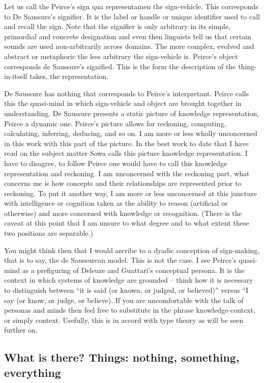 \documentclass[dah,phd,a4paper]{xe_uccthesis}
\begin{document}
	Let us call the Peirce's sign qua representamen the sign-vehicle. This corresponds to De Saussure's signifier. It is the label or handle or unique identifier used to call and recall the sign. Note that the signifier is only arbitrary in its simple, primordial and concrete designation and even then linguists tell us that certain sounds are used non-arbitrarily across domains. The more complex, evolved and abstract or metaphoric the less arbitrary the sign-vehicle is. Peirce's object corresponds de Saussure's signified. This is the form the description of the thing-in-itself takes, the representation.
	
	De Saussure has nothing that corresponds to Peirce's interpretant. Peirce calls this the quasi-mind in which sign-vehicle and object are brought together in understanding. De Saussure presents a static picture of knowledge representation, Peirce a dynamic one. Peirce's picture allows for reckoning, computing, calculating, inferring, deducing, and so on. I am more or less wholly unconcerned in this work with this part of the picture. In the best work to date that I have read on the subject matter Sowa calls this picture knowledge representation. I have to disagree, to follow Peirce one would have to call this knowledge representation and reckoning. I am unconcerned with the reckoning part, what concerns me is how concepts and their relationships are represented prior to reckoning. To put it another way, I am more or less unconcerned at this juncture with intelligence or cognition taken as the ability to reason (artificial or otherwise) and more concerned with knowledge or recognition. (There is the caveat at this point that I am unsure to what degree and to what extent these two positions are separable.)
	
	You might think then that I would ascribe to a dyadic conception of sign-making, that is to say, the de Saussurean model. This is not the case. I see Peirce's quasi-mind as a prefiguring of Deleuze and Guattari's conceptual persona. It is the context in which systems of knowledge are grounded – think how it is necessary to distinguish between “it is said (or known, or judged, or believed)” versus “I say (or know, or judge, or believe). If you are uncomfortable with the talk of personas and minds then feel free to substitute in the phrase knowledge-context, or simply context. Usefully, this is in accord with type theory as will be seen further on.

\subsection{What is there? Things: nothing, something, everything}
\end{document}
